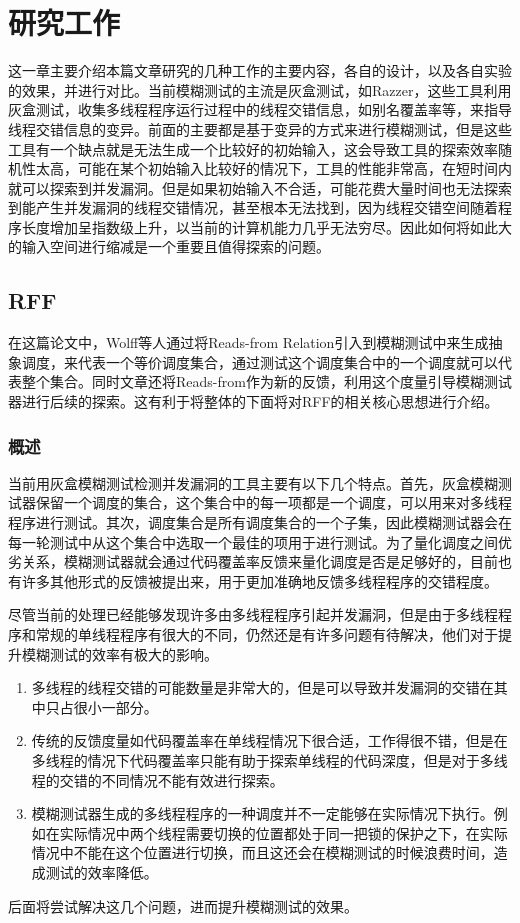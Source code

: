 
\section{研究工作}
这一章主要介绍本篇文章\cite{wolff2024greybox}研究的几种工作的主要内容，各自的设计，以及各自实验的效果，并进行对比。当前模糊测试的主流是灰盒测试，如Razzer\cite{jeong2019razzer}，这些工具利用灰盒测试，收集多线程程序运行过程中的线程交错信息，如别名覆盖率\cite{xu2020krace}等，来指导线程交错信息的变异。前面的主要都是基于变异的方式来进行模糊测试，但是这些工具有一个缺点就是无法生成一个比较好的初始输入，这会导致工具的探索效率随机性太高，可能在某个初始输入比较好的情况下，工具的性能非常高，在短时间内就可以探索到并发漏洞。但是如果初始输入不合适，可能花费大量时间也无法探索到能产生并发漏洞的线程交错情况，甚至根本无法找到，因为线程交错空间随着程序长度增加呈指数级上升，以当前的计算机能力几乎无法穷尽。因此如何将如此大的输入空间进行缩减是一个重要且值得探索的问题。

\subsection{RFF}

在这篇论文中，Wolff\cite{wolff2024greybox}等人通过将Reads-from Relation引入到模糊测试中来生成抽象调度，来代表一个等价调度集合，通过测试这个调度集合中的一个调度就可以代表整个集合。同时文章还将Reads-from作为新的反馈，利用这个度量引导模糊测试器进行后续的探索。这有利于将整体的下面将对RFF的相关核心思想进行介绍。

\subsubsection{概述}

当前用灰盒模糊测试检测并发漏洞的工具主要有以下几个特点。首先，灰盒模糊测试器保留一个调度的集合，这个集合中的每一项都是一个调度，可以用来对多线程程序进行测试。其次，调度集合是所有调度集合的一个子集，因此模糊测试器会在每一轮测试中从这个集合中选取一个最佳的项用于进行测试。为了量化调度之间优劣关系，模糊测试器就会通过代码覆盖率反馈来量化调度是否是足够好的，目前也有许多其他形式的反馈被提出来，用于更加准确地反馈多线程程序的交错程度。

尽管当前的处理已经能够发现许多由多线程程序引起并发漏洞，但是由于多线程程序和常规的单线程程序有很大的不同，仍然还是有许多问题有待解决，他们对于提升模糊测试的效率有极大的影响。
\begin{enumerate}
\item 多线程的线程交错的可能数量是非常大的，但是可以导致并发漏洞的交错在其中只占很小一部分。
\item 传统的反馈度量如代码覆盖率在单线程情况下很合适，工作得很不错，但是在多线程的情况下代码覆盖率只能有助于探索单线程的代码深度，但是对于多线程的交错的不同情况不能有效进行探索。
\item 模糊测试器生成的多线程程序的一种调度并不一定能够在实际情况下执行。例如在实际情况中两个线程需要切换的位置都处于同一把锁的保护之下，在实际情况中不能在这个位置进行切换，而且这还会在模糊测试的时候浪费时间，造成测试的效率降低。
\end{enumerate}
后面将尝试解决这几个问题，进而提升模糊测试的效果。

